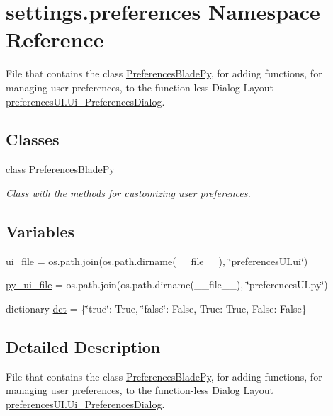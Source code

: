 \hypertarget{namespacesettings_1_1preferences}{}\section{settings.\+preferences Namespace Reference}
\label{namespacesettings_1_1preferences}


File that contains the class \hyperlink{classsettings_1_1preferences_1_1_preferences_blade_py}{Preferences\+Blade\+Py}, for adding functions, for managing user preferences, to the function-\/less Dialog Layout \hyperlink{classsettings_1_1preferences_u_i_1_1_ui___preferences_dialog}{preferences\+U\+I.\+Ui\+\_\+\+Preferences\+Dialog}.  


\subsection*{Classes}
\begin{DoxyCompactItemize}
\item 
class \hyperlink{classsettings_1_1preferences_1_1_preferences_blade_py}{Preferences\+Blade\+Py}
\begin{DoxyCompactList}\small\item\em Class with the methods for customizing user preferences. \end{DoxyCompactList}\end{DoxyCompactItemize}
\subsection*{Variables}
\begin{DoxyCompactItemize}
\item 
\hyperlink{namespacesettings_1_1preferences_a033eb50e8b7b2de7816c6e423cf89fa2}{ui\+\_\+file} = os.\+path.\+join(os.\+path.\+dirname(\+\_\+\+\_\+file\+\_\+\+\_\+), \char`\"{}preferences\+U\+I.\+ui\char`\"{})
\item 
\hyperlink{namespacesettings_1_1preferences_ae7e022019493035187806fac02749517}{py\+\_\+ui\+\_\+file} = os.\+path.\+join(os.\+path.\+dirname(\+\_\+\+\_\+file\+\_\+\+\_\+), \char`\"{}preferences\+U\+I.\+py\char`\"{})
\item 
dictionary \hyperlink{namespacesettings_1_1preferences_a733f21e501f603b086934c865c62d41d}{dct} = \{\char`\"{}true\char`\"{}\+: True, \char`\"{}false\char`\"{}\+: False, True\+: True, False\+: False\}
\end{DoxyCompactItemize}


\subsection{Detailed Description}
File that contains the class \hyperlink{classsettings_1_1preferences_1_1_preferences_blade_py}{Preferences\+Blade\+Py}, for adding functions, for managing user preferences, to the function-\/less Dialog Layout \hyperlink{classsettings_1_1preferences_u_i_1_1_ui___preferences_dialog}{preferences\+U\+I.\+Ui\+\_\+\+Preferences\+Dialog}. 



